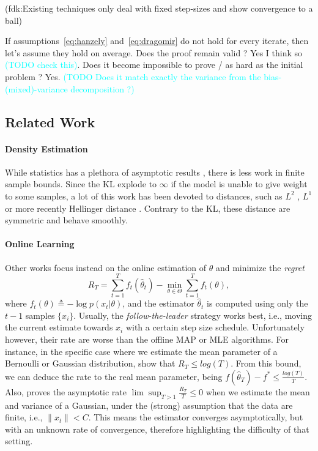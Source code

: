 \documentclass[twoside]{article}
\newcommand{\fdk}[1]{\textcolor{Periwinkle}{(fdk:#1)}}
\newcommand{\TODO}[1]{\textcolor{cyan}{(TODO #1)}}
\begin{document}
\fdk{Existing techniques only deal with fixed step-sizes and show convergence to a ball}

If assumptions~\eqref{eq:hanzely} and~\eqref{eq:dragomir} do not hold for every iterate, then let's assume they hold on average. Does the proof remain valid ? Yes I think so \TODO{check this}. Does it become impossible to prove / as hard as the initial problem ? Yes.
\TODO{Does it match exactly the variance from the bias-(mixed)-variance decomposition ?}

\subsection{Related Work}

\paragraph{Density Estimation}
While statistics has a plethora of asymptotic results \citep{vdv1998asymptotic}, there is less work in finite sample bounds.
Since the KL explode to $\infty$ if the model is unable to give weight to some samples, a lot of this work has been devoted to distances, such as $L^2$ \citep{tsybakov2009introduction}, $L^1$ \citep{devroye2001combinatorial} or more recently Hellinger distance \citep{baraud2017new}.
Contrary to the KL, these distance are symmetric and behave smoothly.

\paragraph{Online Learning}
Other works focus instead on the online estimation of $\theta$ and minimize the \textit{regret}
\[
R_T=\sum_{t=1}^T f_t(\hat{\theta}_t)-\min_{\theta\in\Theta}\sum_{t=1}^Tf_t(\theta),
\]
where $f_t(\theta)\triangleq-\log p(x_t|\theta)$, and the estimator $\hat{\theta}_t$ is computed using only the $t-1$ samples $\{x_i\}$. Usually, the \textit{follow-the-leader} strategy works best, i.e., moving the current estimate towards $x_i$ with a certain step size schedule. Unfortunately however, their rate are worse than the offline MAP or MLE algorithms. For instance, in the specific case where we estimate the mean parameter of a Bernoulli or Gaussian distribution, \citet{azoury2001relative} show that $R_T\leq log(T)$. From this bound, we can deduce the rate  to the real mean parameter, being $f(\hat{\theta}_T)-f^*\leq \frac{log(T)}{T}$. Also, \citet{dasgupta2007online} proves the asymptotic rate $\lim\sup_{T>1}\frac{R_T}{T}\leq 0$ when we estimate the mean and variance of a Gaussian, under the (strong) assumption that the data are finite, i.e., $\|x_t\|<C$. This means the estimator converges asymptotically, but with an unknown rate of convergence, therefore highlighting the difficulty of that setting.
\end{document}
